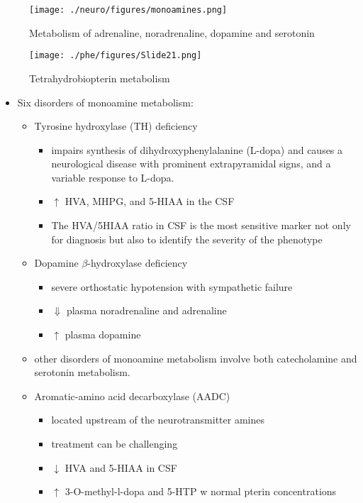 \documentclass{scrartcl}
\begin{document}
\begin{figure}[htbp]
\centering
\texttt{[image: ./neuro/figures/monoamines.png]}
\caption{\label{fig:org8bf4792}
Metabolism of adrenaline, noradrenaline, dopamine and serotonin}
\end{figure}

\begin{figure}[htbp]
\centering
\texttt{[image: ./phe/figures/Slide21.png]}
\caption{\label{fig:org6641c02}
Tetrahydrobiopterin metabolism}
\end{figure}

\begin{itemize}
\item Six disorders of monoamine metabolism:
\begin{itemize}
\item Tyrosine hydroxylase (TH) deficiency
\begin{itemize}
\item impairs synthesis of dihydroxyphenylalanine (L-dopa) and causes
a neurological disease with prominent extrapyramidal signs, and
a variable response to L-dopa.
\item \(\uparrow\) HVA, MHPG, and 5-HIAA in the CSF
\item The HVA/5HIAA ratio in CSF is the most sensitive marker not only
for diagnosis but also to identify the severity of the phenotype
\end{itemize}
\item Dopamine \(\beta\)-hydroxylase deficiency
\begin{itemize}
\item severe orthostatic hypotension with sympathetic failure
\item \(\Downarrow\) plasma noradrenaline and adrenaline
\item \(\uparrow\) plasma dopamine
\end{itemize}
\item other disorders of monoamine metabolism involve both catecholamine
and serotonin metabolism.
\item Aromatic-amino acid decarboxylase (AADC)
\begin{itemize}
\item located upstream of the neurotransmitter amines
\item treatment can be challenging
\item \(\downarrow\) HVA and 5-HIAA in CSF
\item \(\uparrow\) 3-O-methyl-l-dopa and 5-HTP w normal pterin concentrations

\end{itemize}
\end{itemize}
\end{itemize}
\end{document}
